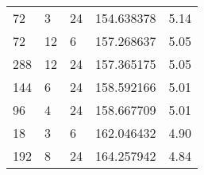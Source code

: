 \begin{table}[H]
\begin{tabularx}{0.8\textwidth}{XXXX|X}
    72   &  3   & 24    &  154.638378 & 5.14 \\
    72   &  12  & 6     &  157.268637 & 5.05 \\
    288  &  12  & 24    &  157.365175 & 5.05 \\
    144  &  6   & 24    &  158.592166 & 5.01 \\
    96   &  4   & 24    &  158.667709 & 5.01 \\
    18   &  3   & 6     &  162.046432 & 4.90 \\
    192  &  8   & 24    &  164.257942 & 4.84 \\
    \bottomrule
  \end{tabularx}
\end{table}

